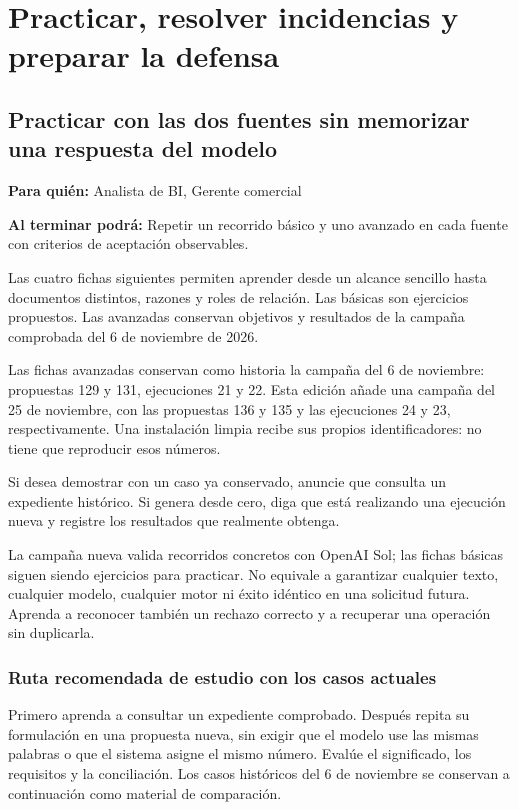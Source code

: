 \chapter{Practicar, resolver incidencias y preparar la defensa}
\section{Practicar con las dos fuentes sin memorizar una respuesta del modelo}
\label{unidad:PR01}
\textbf{Para quién:} Analista de BI, Gerente comercial\par
\textbf{Al terminar podrá:} Repetir un recorrido básico y uno avanzado en cada fuente con criterios de aceptación observables.

Las cuatro fichas siguientes permiten aprender desde un alcance sencillo hasta documentos distintos, razones y roles de relación. Las básicas son ejercicios propuestos. Las avanzadas conservan objetivos y resultados de la campaña comprobada del 6 de noviembre de 2026.

Las fichas avanzadas conservan como historia la campaña del 6 de noviembre: propuestas 129 y 131, ejecuciones 21 y 22. Esta edición añade una campaña del 25 de noviembre, con las propuestas 136 y 135 y las ejecuciones 24 y 23, respectivamente. Una instalación limpia recibe sus propios identificadores: no tiene que reproducir esos números.

Si desea demostrar con un caso ya conservado, anuncie que consulta un expediente histórico. Si genera desde cero, diga que está realizando una ejecución nueva y registre los resultados que realmente obtenga.

La campaña nueva valida recorridos concretos con OpenAI Sol; las fichas básicas siguen siendo ejercicios para practicar. No equivale a garantizar cualquier texto, cualquier modelo, cualquier motor ni éxito idéntico en una solicitud futura. Aprenda a reconocer también un rechazo correcto y a recuperar una operación sin duplicarla.

\subsection{Ruta recomendada de estudio con los casos actuales}
Primero aprenda a consultar un expediente comprobado. Después repita su formulación en una propuesta nueva, sin exigir que el modelo use las mismas palabras o que el sistema asigne el mismo número. Evalúe el significado, los requisitos y la conciliación. Los casos históricos del 6 de noviembre se conservan a continuación como material de comparación.

